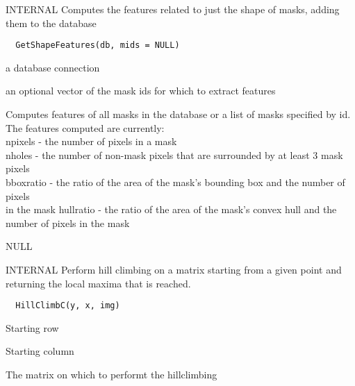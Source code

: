 \documentclass[a4paper]{book}
\begin{document}
%
\begin{Description}\relax
INTERNAL Computes the features related to just the shape
of masks, adding them to the database
\end{Description}
%
\begin{Usage}
\begin{verbatim}
  GetShapeFeatures(db, mids = NULL)
\end{verbatim}
\end{Usage}
%
\begin{Arguments}
\begin{ldescription}
\item[\code{db}] a database connection

\item[\code{mids}] an optional vector of the mask ids for which
to extract features
\end{ldescription}
\end{Arguments}
%
\begin{Details}\relax
Computes features of all masks in the database or a list
of masks specified by id.  The features computed are
currently:\\{} npixels - the number of pixels in a mask
\\{} nholes - the number of non-mask pixels that are
surrounded by at least 3 mask pixels\\{} bboxratio - the
ratio of the area of the mask's bounding box and the
number of pixels\\{} in the mask hullratio - the ratio of
the area of the mask's convex hull and the number of
pixels in the mask\\{}
\end{Details}
%
\begin{Value}
NULL
\end{Value}
%
\begin{Description}\relax
INTERNAL Perform hill climbing on a matrix starting from
a given point and returning the local maxima that is
reached.
\end{Description}
%
\begin{Usage}
\begin{verbatim}
  HillClimbC(y, x, img)
\end{verbatim}
\end{Usage}
%
\begin{Arguments}
\begin{ldescription}
\item[\code{y}] Starting row

\item[\code{x}] Starting column

\item[\code{img}] The matrix on which to performt the
hillclimbing
\end{ldescription}
\end{Arguments}
\end{document}
